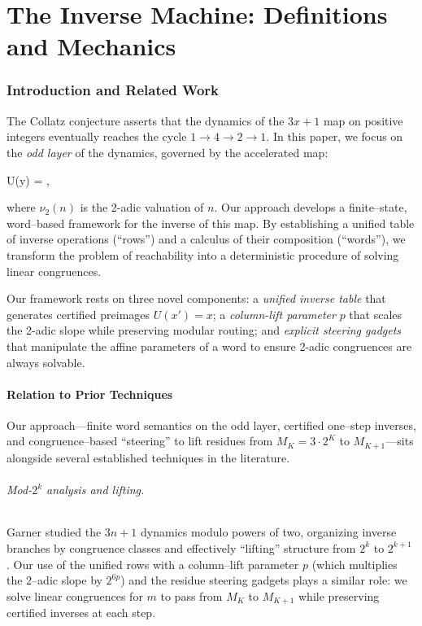 \documentclass[11pt,letterpaper]{amsart}
\def\[{ }%
\def\]{ }%
\theoremstyle{definition}
\theoremstyle{plain}
\theoremstyle{plain}
\theoremstyle{remark}
\begin{document}
\part{The Inverse Machine: Definitions and Mechanics}


\section{Introduction and Related Work}
\label{sec:introduction}

The Collatz conjecture asserts that the dynamics of the $3x+1$ map on positive integers eventually reaches the cycle $1 \to 4 \to 2 \to 1$. In this paper, we focus on the \emph{odd layer} of the dynamics, governed by the accelerated map:
\[
U(y) = ,
\]
where $\nu_2(n)$ is the 2-adic valuation of $n$. Our approach develops a finite--state, word--based framework for the inverse of this map. By establishing a unified table of inverse operations (``rows'') and a calculus of their composition (``words''), we transform the problem of reachability into a deterministic procedure of solving linear congruences.

Our framework rests on three novel components: a \emph{unified inverse table} that generates certified preimages $U(x')=x$; a \emph{column-lift parameter} $p$ that scales the 2-adic slope while preserving modular routing; and \emph{explicit steering gadgets} that manipulate the affine parameters of a word to ensure 2-adic congruences are always solvable.

\subsection{Relation to Prior Techniques}

Our approach—finite word semantics on the odd layer, certified one–step inverses, and congruence–based “steering” to lift residues from $M_K=3\cdot 2^K$ to $M_{K+1}$—sits alongside several established techniques in the literature.

\paragraph{Mod-$2^k$ analysis and lifting.}
Garner studied the $3n{+}1$ dynamics modulo powers of two, organizing inverse branches by congruence classes and effectively “lifting” structure from $2^k$ to $2^{k+1}$ \cite{Garner1981}. Our use of the unified rows with a column–lift parameter $p$ (which multiplies the $2$–adic slope by $2^{6p}$) and the residue steering gadgets plays a similar role: we solve linear congruences for $m$ to pass from $M_K$ to $M_{K+1}$ while preserving certified inverses at each step.
\end{document}
